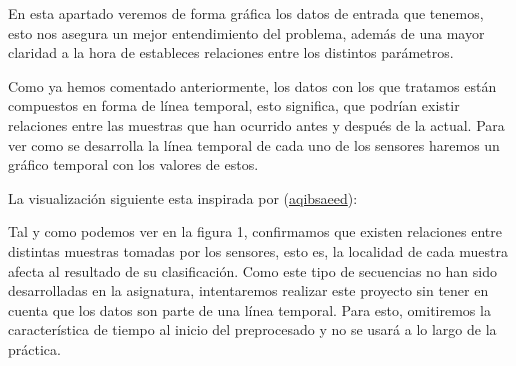 \documentclass{article}
\begin{document}
En esta apartado veremos de forma gráfica los datos de entrada que tenemos, esto nos asegura un mejor entendimiento del problema, además de una mayor claridad a la hora de estableces relaciones entre los distintos parámetros.


Como ya hemos comentado anteriormente, los datos con los que tratamos están compuestos en forma de línea temporal, esto significa, que podrían existir relaciones entre las muestras que han ocurrido antes y después de la actual. Para ver como se desarrolla la línea temporal de cada uno de los sensores haremos un gráfico temporal con los valores de estos.

La visualización siguiente esta inspirada por (\href{https://github.com/aqibsaeed/Occupancy-Detection}{\color{blue}aqibsaeed}):

\begin{figure}[H]
    \centering
\end{figure}

Tal y como podemos ver en la figura 1, confirmamos que existen relaciones entre distintas muestras tomadas por los sensores, esto es, la localidad de cada muestra afecta al resultado de su clasificación. Como este tipo de secuencias no han sido desarrolladas en la asignatura, intentaremos realizar este proyecto sin tener en cuenta que los datos son parte de una línea temporal. Para esto, omitiremos la característica de tiempo al inicio del preprocesado y no se usará a lo largo de la práctica.
\end{document}
